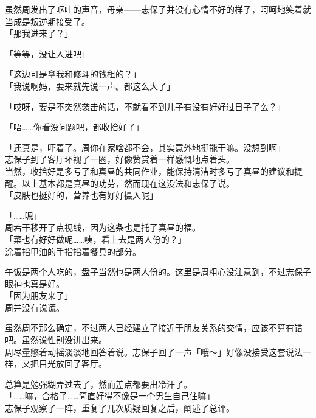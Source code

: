 虽然周发出了呕吐的声音，母亲——志保子并没有心情不好的样子，呵呵地笑着就当成是叛逆期接受了。\\

「那我进来了？」

「等等，没让人进吧」

「这边可是拿我和修斗的钱租的？」\\

「我说啊妈，要来就先说一声。都这么大了」

「哎呀，要是不突然袭击的话，不就看不到儿子有没有好好过日子了么？」

「唔……你看没问题吧，都收拾好了」

「还真是，吓着了。周你在家啥都不会，其实意外地挺能干嘛。没想到啊」\\

志保子到了客厅环视了一圈，好像赞赏着一样感慨地点着头。\\

当然，收拾好是多亏了和真昼的共同作业，能保持清洁时多亏了真昼的建议和提醒。以上基本都是真昼的功劳，然而现在这没法和志保子说。\\

「皮肤也挺好的，营养也有好好摄入呢」

「……嗯」\\

周若干移开了点视线，因为这条也是托了真昼的福。\\

「菜也有好好做呢……咦，看上去是两人份的？」\\

涂着指甲油的手指指着餐具的部分。

午饭是两个人吃的，盘子当然也是两人份的。这里是周粗心没注意到，不过志保子眼神也真是好。\\

「因为朋友来了」\\

周并没有说谎。

虽然周不那么确定，不过两人已经建立了接近于朋友关系的交情，应该不算有错吧。虽然说性别没讲出来。\\

周尽量憋着动摇淡淡地回答着说。志保子回了一声「哦～」好像没接受这套说法一样，又把目光放回了客厅。

总算是勉强糊弄过去了，然而差点都要出冷汗了。\\

「……嘛，合格了……简直好得不像是一个男生自己住嘛」\\

志保子观察了一阵，重复了几次质疑回复之后，阐述了总评。

